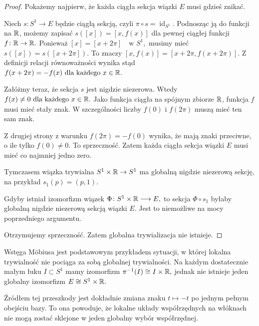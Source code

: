 \begin{proof}
Pokażemy najpierw, że każda ciągła sekcja wiązki $E$
musi gdzieś znikać.

Niech
$
s\colon S^1\to E
$
będzie ciągłą sekcją, czyli
$
\pi\circ s=\operatorname{id}_{S^1}.
$
Podnosząc ją do funkcji na $\mathbb{R}$, możemy zapisać
$
s([x])=[x,f(x)]
$
dla pewnej ciągłej funkcji
$
f\colon\mathbb{R}\to\mathbb{R}.
$
Ponieważ
$
[x]=[x+2\pi]
\quad\text{w }S^1,
$
musimy mieć
$
s([x])=s([x+2\pi]).
$
To znaczy
$
[x,f(x)]=[x+2\pi,f(x+2\pi)].
$
Z definicji relacji równoważności wynika stąd
$
f(x+2\pi)=-f(x)
\ \text{dla każdego }x\in\mathbb{R}.
$

Załóżmy teraz, że sekcja $s$ jest nigdzie niezerowa.
Wtedy
$
f(x)\neq 0
\ \text{dla każdego }x\in\mathbb{R}.
$
Jako funkcja ciągła na spójnym zbiorze $\mathbb{R}$,
funkcja $f$ musi mieć stały znak.
W szczególności liczby $f(0)$ i $f(2\pi)$
muszą mieć ten sam znak.

Z drugiej strony z warunku
$
f(2\pi)=-f(0)
$
wynika, że mają znaki przeciwne, o ile tylko $f(0)\neq 0$.
To sprzeczność. Zatem każda ciągła sekcja wiązki $E$
musi mieć co najmniej jedno zero.

Tymczasem wiązka trywialna
$
S^1\times\mathbb{R}\to S^1
$
ma globalną nigdzie niezerową sekcję, na przykład
$
s_1(p)=(p,1).
$

Gdyby istniał izomorfizm wiązek
$
\Phi\colon S^1\times\mathbb{R}\longrightarrow E,
$
to sekcja
$
\Phi\circ s_1
$
byłaby globalną nigdzie niezerową sekcją wiązki $E$.
Jest to niemożliwe na mocy poprzedniego argumentu.

Otrzymujemy sprzeczność. Zatem globalna trywializacja nie istnieje.
\end{proof}

\begin{uwaga}
Wstęga Möbiusa jest podstawowym przykładem sytuacji, w której
lokalna trywialność nie pociąga za sobą globalnej trywialności.
Na każdym dostatecznie małym łuku
$
I\subset S^1
$
mamy izomorfizm
$
\pi^{-1}(I)\cong I\times\mathbb{R},
$
jednak nie istnieje jeden globalny izomorfizm
$
E\cong S^1\times\mathbb{R}.
$

Źródłem tej przeszkody jest dokładnie zmiana znaku
$
t\longmapsto -t
$
po jednym pełnym obejściu bazy.
To ona powoduje, że lokalne układy współrzędnych na włóknach
nie mogą zostać sklejone w jeden globalny wybór współrzędnej.
\end{uwaga}


